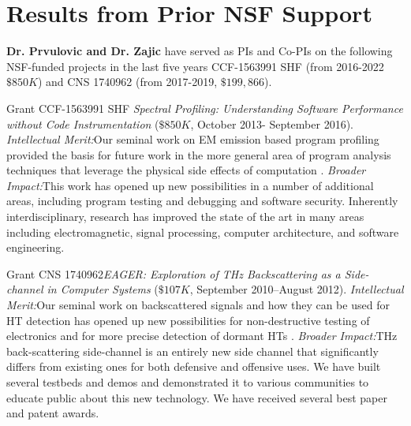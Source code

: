 \documentclass[11 pt]{article}
\begin{document}
\section{Results from Prior NSF Support}
\label{sec:prior}
\noindent
{\bf Dr. Prvulovic and Dr. Zajic} have served as PIs and Co-PIs on the following NSF-funded projects in the last five years CCF-1563991 SHF (from 2016-2022 $\$850K$) and CNS 1740962 (from 2017-2019, $\$199,866$).

Grant CCF-1563991 SHF \textit{Spectral Profiling: Understanding Software Performance without Code Instrumentation}
($\$850K$, October 2013- September 2016).
\textit{Intellectual Merit:}Our seminal work on EM emission based program profiling provided the basis for
future work in the more general area of program analysis techniques that leverage the physical side
effects of computation \cite{Zop, Zop2, Nader2016, Elvan2021}.
\textit{Broader Impact:}This work has opened up new possibilities in a number of additional areas,
including program testing and debugging and software security. Inherently interdisciplinary, research has improved the state of the art in many areas including electromagnetic, signal processing, computer architecture, and software engineering.

Grant CNS 1740962\textit{EAGER: Exploration of THz Backscattering
as a Side-channel in Computer Systems}
($\$107K$, September 2010--August 2012).
\textit{Intellectual Merit:}Our seminal work on backscattered signals and how they can be used for HT detection has opened up new possibilities
for non-destructive testing of electronics and for more precise detection of dormant HTs \cite{Pavel2020,nguyen19,Erik2022}.
\textit{Broader Impact:}THz back-scattering side-channel is an entirely new side channel that significantly differs
from existing ones for both defensive and offensive uses. We have built several testbeds and demos and demonstrated it to various communities
to educate public about this new technology. We have received several best paper and patent awards.
\end{document}
